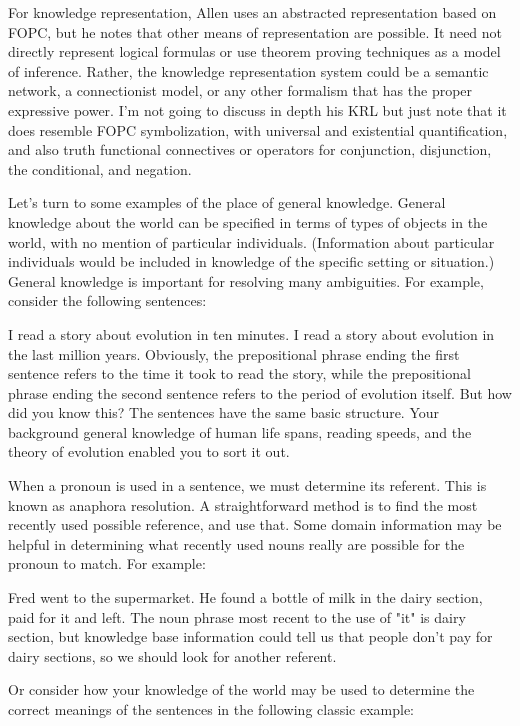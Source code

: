 For knowledge representation, Allen uses an abstracted representation based on FOPC, but he notes that other means of representation are possible. It need not directly represent logical formulas or use theorem proving techniques as a model of inference. Rather, the knowledge representation system could be a semantic network, a connectionist model, or any other formalism that has the proper expressive power. I'm not going to discuss in depth his KRL but just note that it does resemble FOPC symbolization, with universal and existential quantification, and also truth functional connectives or operators for conjunction, disjunction, the conditional, and negation.

Let's turn to some examples of the place of general knowledge. General knowledge about the world can be specified in terms of types of objects in the world, with no mention of particular individuals. (Information about particular individuals would be included in knowledge of the specific setting or situation.) General knowledge is important for resolving many ambiguities. For example, consider the following sentences:

I read a story about evolution in ten minutes.
I read a story about evolution in the last million years. 
Obviously, the prepositional phrase ending the first sentence refers to the time it took to read the story, while the prepositional phrase ending the second sentence refers to the period of evolution itself. But how did you know this? The sentences have the same basic structure. Your background general knowledge of human life spans, reading speeds, and the theory of evolution enabled you to sort it out.

When a pronoun is used in a sentence, we must determine its referent. This is known as anaphora resolution. A straightforward method is to find the most recently used possible reference, and use that. Some domain information may be helpful in determining what recently used nouns really are possible for the pronoun to match. For example:

Fred went to the supermarket.  He found a bottle of milk in the dairy section, paid for it and left.
The noun phrase most recent to the use of "it" is dairy section, but knowledge base information could tell us that people don't pay for dairy sections, so we should look for another referent.

Or consider how your knowledge of the world may be used to determine the correct meanings of the sentences in the following classic example:

